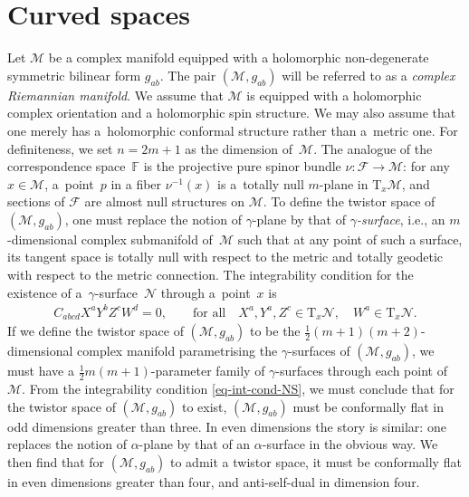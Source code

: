 \documentclass[pdftex]{sigma}
\numberwithin{equation}{section}
\newcommand{\mc} [1]{\mathcal{#1}}
\newcommand{\Tgt} {\mathrm{T}}
\newcommand{\F} {\mathbb{F}}
\begin{document}
\section{Curved spaces}\label{sec-curved}
Let $\mc{M}$ be a complex manifold equipped with a holomorphic non-degenerate symmetric bi\-li\-near form $g_{ab}$. The pair $(\mc{M},g_{ab})$ will be referred to as a \emph{complex Riemannian manifold}. We assume that $\mc{M}$ is equipped with a holomorphic complex orientation and a holomorphic spin structure. We may also assume that one merely has a~holomorphic conformal structure rather than a~metric one. For def\/initeness, we set $n=2m+1$ as the dimension of~$\mc{M}$. The analogue of the correspondence space~$\F$ is the projective pure spinor bundle $\nu\colon \mc{F} \rightarrow \mc{M}$: for any $x \in \mc{M}$, a~point~$p$ in a f\/iber $\nu^{-1}(x)$ is a~totally null $m$-plane in $\Tgt_x \mc{M}$, and sections of $\mc{F}$ are almost null structures on $\mc{M}$. To def\/ine the twistor space of $(\mc{M},g_{ab})$, one must replace the notion of $\gamma$-plane by that of \emph{$\gamma$-surface}, i.e., an $m$-dimensional complex submanifold of~$\mc{M}$ such that at any point of such a surface, its tangent space is totally null with respect to the metric and totally geodetic with respect to the metric connection. The integrability condition for the existence of a~$\gamma$-surface~$\mc{N}$ through a~point~$x$ is~\cite{Taghavi-Chabert2013}
\begin{gather}\label{eq-int-cond-NS}
C_{abcd} X^a Y^b Z^c W^d = 0 , \qquad \text{for all} \quad X^a, Y^a, Z^c \in \Tgt_x \mc{N}, \quad W^a \in \Tgt_x \mc{N}.
\end{gather}
If we def\/ine the twistor space of $(\mc{M},g_{ab})$ to be the $\frac{1}{2}(m+1)(m+2)$-dimensional complex manifold parametrising the $\gamma$-surfaces of $(\mc{M},g_{ab})$, we must have a $\frac{1}{2}m(m+1)$-parameter family of $\gamma$-surfaces through each point of $\mc{M}$. From the integrability condition \eqref{eq-int-cond-NS}, we must conclude that for the twistor space of $(\mc{M},g_{ab})$ to exist, $(\mc{M},g_{ab})$ must be conformally f\/lat in odd dimensions greater than three. In even dimensions the story is similar: one replaces the notion of $\alpha$-plane by that of an $\alpha$-surface in the obvious way. We then f\/ind that for $(\mc{M},g_{ab})$ to admit a twistor space, it must be conformally f\/lat in even dimensions greater than four, and anti-self-dual in dimension four.
\end{document}
